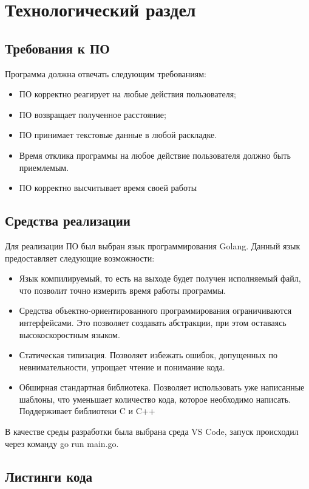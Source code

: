 \chapter{Технологический раздел}

\section{Требования к ПО}
Программа должна отвечать следующим требованиям:
\begin{itemize}
	\item ПО корректно реагирует на любые действия пользователя;
	\item ПО возвращает полученное расстояние;
	\item ПО принимает текстовые данные в любой раскладке.
	\item Время отклика программы на любое действие пользователя должно быть приемлемым.
	\item ПО корректно высчитывает время своей работы 
\end{itemize}
\section{Средства реализации}
Для реализации ПО был выбран язык программирования Golang\cite{golang}. Данный язык предоставляет следующие возможности:
\begin{itemize}
	\item Язык компилируемый, то есть на выходе будет получен исполняемый файл, что позволит точно измерить время работы программы.
	\item Средства объектно-ориентированного программирования ограничиваются интерфейсами. Это позволяет создавать абстракции, при этом оставаясь высокоскоростным языком.
	\item Статическая типизация. Позволяет избежать ошибок, допущенных по невнимательности, упрощает чтение и понимание кода.
	\item Обширная стандартная библиотека. Позволяет использовать уже написанные шаблоны, что уменьшает количество кода, которое необходимо написать. Поддерживает библиотеки C и C++  
\end{itemize}

В качестве среды разработки была выбрана среда VS Code\cite{rune}, запуск происходил через команду go run main.go.

\section{Листинги кода}
